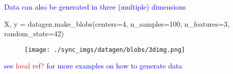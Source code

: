 \textcolor{blue}{Data can also be generated in three (multiple) dimensions}

\begin{python}
X, y = datagen.make_blobs(centers=4, n_samples=100, n_features=3, random_state=42)
\end{python}



\begin{figure}
\centering
\texttt{[image: ./sync\_imgs/datagen/blobs/3dimg.png]}
\label{fig:datagen_blobs_3dimg}
\end{figure}



\textcolor{blue}{see \textcolor{red}{local ref?} for more examples on how to generate data}
